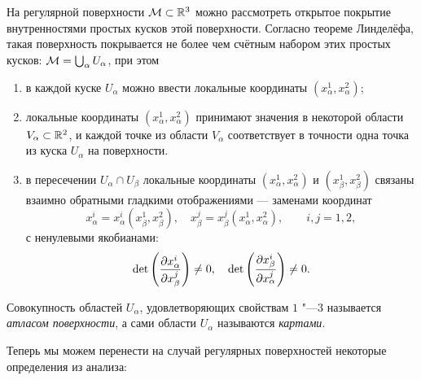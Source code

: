 На регулярной поверхности $\mathcal{M} \subset \mathbb{R}^3$ можно рассмотреть открытое покрытие внутренностями простых кусков этой поверхности. Согласно теореме Линделёфа\footnotemark, такая поверхность покрывается не более чем счётным набором этих простых кусков: $\mathcal{M} = \bigcup_\alpha U_\alpha$, при этом


\begin{enumerate}[nolistsep, label=(\arabic*)]
	\item в каждой куске $U_\alpha$ можно ввести локальные координаты $(x^1_\alpha, x^2_\alpha)$;
	\item локальные координаты $(x^1_\alpha, x^2_\alpha)$ принимают значения в некоторой области $V_\alpha \subset \mathbb{R}^2$, и каждой точке из области $V_\alpha$ соответствует в точности одна точка из куска $U_\alpha$ на поверхности.
	\item в пересечении $U_\alpha \cap U_\beta$ локальные координаты $(x^1_\alpha, x^2_\alpha)$ и $(x^1_\beta, x^2_\beta)$ связаны взаимно обратными гладкими отображениями --- заменами координат
		\[
			x^i_\alpha = x^i_\alpha(x^1_\beta, x^2_\beta),\quad x^j_\beta = x^j_\beta(x^1_\alpha, x^2_\alpha),\qquad i, j = 1, 2,
		\]
		с ненулевыми якобианами:
		\[
			\det\left(\frac{\partial x^i_\alpha}{\partial x^j_\beta}\right) \ne 0,\quad \det\left(\frac{\partial x^i_\beta}{\partial x^j_\alpha}\right) \ne 0.
		\]
\end{enumerate}

\begin{definition}
	Совокупность областей $U_\alpha$, удовлетворяющих свойствам $1$ "---$3$ называется \textit{атласом поверхности}, а сами области $U_\alpha$ называются \textit{картами}.
\end{definition}

Теперь мы можем перенести на случай регулярных поверхностей некоторые определения из анализа:

